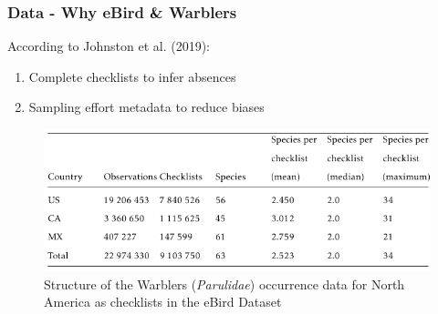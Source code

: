 \documentclass[10pt]{beamer}
\begin{document}
\begin{frame}
  \frametitle{Data - Why eBird \& Warblers}
  According to Johnston et al. (2019):
  \begin{enumerate}
    \item Complete checklists to infer absences
    \item Sampling effort metadata to reduce biases
  \end{enumerate}
  \begin{figure}
    \centering
    \caption{Structure of the Warblers (\textit{Parulidae}) occurrence data for North America as checklists in the eBird Dataset}
    \hspace*{-0cm}\includegraphics[scale=0.4]{fig/ebird_table.png}
  \end{figure}
\end{frame}
\end{document}
